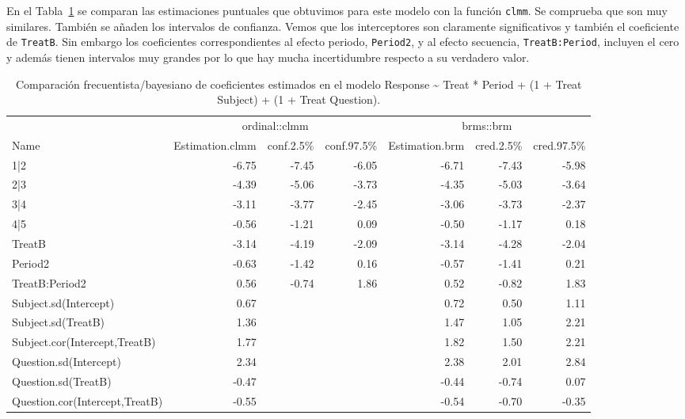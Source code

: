 \documentclass[
  12pt,
  a4paper,
  extrafontsizes,
  onecolumn,
  openright]{memoir}
\begin{document}
\normalsize

En el Tabla~\ref{tbl-model-comp} se comparan las estimaciones puntuales
que obtuvimos para este modelo con la función \texttt{clmm}. Se
comprueba que son muy similares. También se añaden los intervalos de
confianza. Vemos que los interceptores son claramente significativos y
también el coeficiente de \texttt{TreatB}. Sin embargo los coeficientes
correspondientes al efecto periodo, \texttt{Period2}, y al efecto
secuencia, \texttt{TreatB:Period}, incluyen el cero y además tienen
intervalos muy grandes por lo que hay mucha incertidumbre respecto a su
verdadero valor.

\tiny

\hypertarget{tbl-model-comp}{}
\begin{longtable}{lrrrrrr}
\caption{\label{tbl-model-comp}Comparación frecuentista/bayesiano de coeficientes estimados en el
modelo Response \textasciitilde{} Treat * Period + (1 + Treat \textbar{}
Subject) + (1 + Treat \textbar{} Question). }\tabularnewline

\toprule
 & \multicolumn{3}{c}{ordinal::clmm} & \multicolumn{3}{c}{brms::brm} \\ 
\cmidrule(lr){2-4} \cmidrule(lr){5-7}
Name & Estimation.clmm & conf.2.5\% & conf.97.5\% & Estimation.brm & cred.2.5\% & cred.97.5\% \\ 
\midrule
1|2 & -6.75 & -7.45 & -6.05 & -6.71 & -7.43 & -5.98 \\ 
2|3 & -4.39 & -5.06 & -3.73 & -4.35 & -5.03 & -3.64 \\ 
3|4 & -3.11 & -3.77 & -2.45 & -3.06 & -3.73 & -2.37 \\ 
4|5 & -0.56 & -1.21 & 0.09 & -0.50 & -1.17 & 0.18 \\ 
TreatB & -3.14 & -4.19 & -2.09 & -3.14 & -4.28 & -2.04 \\ 
Period2 & -0.63 & -1.42 & 0.16 & -0.57 & -1.41 & 0.21 \\ 
TreatB:Period2 & 0.56 & -0.74 & 1.86 & 0.52 & -0.82 & 1.83 \\ 
Subject.sd(Intercept) & 0.67 &  &  & 0.72 & 0.50 & 1.11 \\ 
Subject.sd(TreatB) & 1.36 &  &  & 1.47 & 1.05 & 2.21 \\ 
Subject.cor(Intercept,TreatB) & 1.77 &  &  & 1.82 & 1.50 & 2.21 \\ 
Question.sd(Intercept) & 2.34 &  &  & 2.38 & 2.01 & 2.84 \\ 
Question.sd(TreatB) & -0.47 &  &  & -0.44 & -0.74 & 0.07 \\ 
Question.cor(Intercept,TreatB) & -0.55 &  &  & -0.54 & -0.70 & -0.35 \\ 
\bottomrule
\end{longtable}
\end{document}
